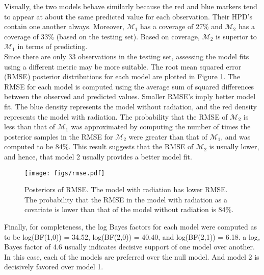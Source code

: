 \documentclass{../../tex_template/asaproc}
\newcommand{\M}{\mathcal{M}}
\begin{document}
Visually, the two models behave similarly because the red and blue markers tend
to appear at about the same predicted value for each observation. Their HPD's
contain one another always. Moreover, $\M_1$ has a coverage of 27\% and $\M_2$ has
a coverage of 33\% (based on the testing set). Based on coverage, $\M_2$ is superior
to $\M_1$ in terms of predicting.\\

Since there are only 33 observations in the testing set, assessing the model
fits using a different metric may be more suitable. The root mean squared error
(RMSE) posterior distributions for each model are plotted in Figure
\ref{fig:rmse}. The RMSE for each model is computed using the average sum of
squared differences between the observed and predicted values. Smaller RMSE's
imply better model fit. The blue density represents the model without
radiation, and the red density represents the model with radiation.  The
probability that the RMSE of $\M_2$ is less than that of $\M_1$ was
approximated by computing the number of times the posterior samples in the RMSE
for $\M_2$ were greater than that of $\M_1$, and was computed to be 84\%.
This result suggests that the RMSE of $\M_2$ is usually lower, and hence, that
model 2 usually provides a better model fit.
\begin{figure}[H]
  \texttt{[image: figs/rmse.pdf]}
  \caption{\small Posteriors of RMSE. The model with radiation has lower RMSE.
    The probability that the RMSE in the model with radiation as a covariate
    is lower than that of the model without radiation is 84\%.}
  \label{fig:rmse}
\end{figure}

Finally, for completeness, the log Bayes factors for each model were computed
as to be log(BF(1,0)) = 34.52, log(BF(2,0)) =  40.40, and log(BF(2,1)) = 6.18.
a log$_e$ Bayes factor of 4.6 usually indicates decisive support of one model
over another. In this case, each of the models are preferred over the null
model. And model 2 is decisively favored over model 1. \\
\end{document}
